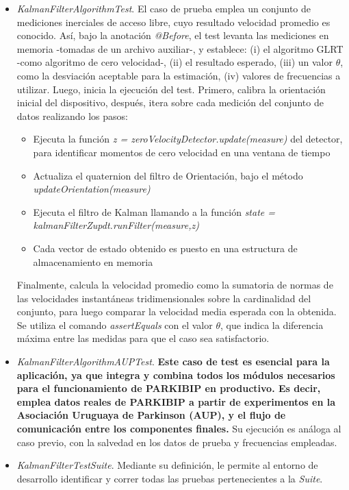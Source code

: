 \begin{itemize}
    \begin{itemize}
        \item \textit{KalmanFilterAlgorithmTest}. El caso de prueba emplea un conjunto de mediciones inerciales de acceso libre, cuyo resultado velocidad promedio es conocido. Así, bajo la anotación \textit{@Before}, el test levanta las mediciones en memoria -tomadas de un archivo auxiliar-, y establece: (i) el algoritmo GLRT -como algoritmo de cero velocidad-, (ii) el resultado esperado, (iii) un valor $\theta$, como la desviación aceptable para la estimación, (iv) valores de frecuencias a utilizar. Luego, inicia la ejecución del test. Primero, calibra la orientación inicial del dispositivo, después,  itera sobre cada medición del conjunto de datos realizando los pasos:
        \begin{itemize}
            \item Ejecuta la función \textit{z = zeroVelocityDetector.update(measure)} del detector, para identificar momentos de cero velocidad en una ventana de tiempo
            \item Actualiza el quaternion del filtro de Orientación, bajo el método \textit{updateOrientation(measure)}
            \item Ejecuta el filtro de Kalman llamando a la función \textit{state = kalmanFilterZupdt.runFilter(measure,z)}
            \item Cada vector de estado obtenido es puesto en una estructura de almacenamiento en memoria
        \end{itemize}
        Finalmente, calcula la velocidad promedio como la sumatoria de normas de las velocidades instantáneas tridimensionales sobre la cardinalidad del conjunto, para luego comparar la velocidad media esperada con la obtenida. Se utiliza el comando \textit{assertEquals} con el valor $\theta$, que indica la diferencia máxima entre las medidas para que el caso sea satisfactorio.
        \item \textit{KalmanFilterAlgorithmAUPTest}. \textbf{Este caso de test es esencial para la aplicación, ya que integra y combina todos los módulos necesarios para el funcionamiento de PARKIBIP en productivo. Es decir, emplea datos reales de PARKIBIP a partir de experimentos en la Asociación Uruguaya de Parkinson (AUP), y el flujo de comunicación entre los componentes finales.} Su ejecución es análoga al caso previo, con la salvedad en los datos de prueba y frecuencias empleadas.
        \item \textit{KalmanFilterTestSuite}. Mediante su definición, le permite al entorno de desarrollo identificar y correr todas las pruebas pertenecientes a la \textit{Suite}.
    \end{itemize}
\end{itemize}


